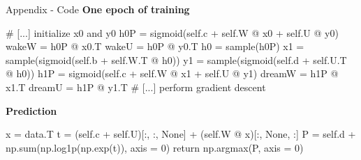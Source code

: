 \documentclass[10pt]{beamer}
\begin{document}
\begin{frame}[fragile]{Appendix - Code}
\textbf{One epoch of training}
\begin{python}
# [...] initialize x0 and y0
h0P = sigmoid(self.c + self.W @ x0 + self.U @ y0)
wakeW = h0P @ x0.T
wakeU = h0P @ y0.T
h0 = sample(h0P)
x1 = sample(sigmoid(self.b + self.W.T @ h0))
y1 = sample(sigmoid(self.d + self.U.T @ h0))
h1P = sigmoid(self.c + self.W @ x1 + self.U @ y1)
dreamW = h1P @ x1.T
dreamU = h1P @ y1.T
# [...] perform gradient descent
\end{python}

\textbf{Prediction}
\begin{python}
x = data.T
t = (self.c + self.U)[:, :, None] + (self.W @ x)[:, None, :]
P = self.d + np.sum(np.log1p(np.exp(t)), axis = 0)
return np.argmax(P, axis = 0)
\end{python}
\end{frame}
\end{document}
